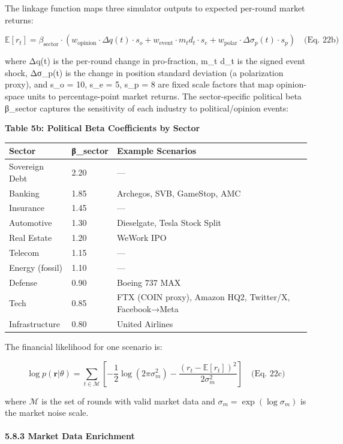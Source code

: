 \documentclass[
]{article}
\begin{document}
The linkage function maps three simulator outputs to expected per-round
market returns:

\[\mathbb{E}[r_t] = \beta_{\text{sector}} \cdot \left( w_{\text{opinion}} \cdot \Delta q(t) \cdot s_o + w_{\text{event}} \cdot m_t d_t \cdot s_e + w_{\text{polar}} \cdot \Delta \sigma_p(t) \cdot s_p \right) \quad \text{(Eq. 22b)}\]

where Δq(t) is the per-round change in pro-fraction, m\_t d\_t is the
signed event shock, Δσ\_p(t) is the change in position standard
deviation (a polarization proxy), and s\_o = 10, s\_e = 5, s\_p = 8 are
fixed scale factors that map opinion-space units to percentage-point
market returns. The sector-specific political beta β\_sector captures
the sensitivity of each industry to political/opinion events:

\textbf{Table 5b: Political Beta Coefficients by Sector}

\begin{longtable}[]{@{}lll@{}}
\toprule\noalign{}
Sector & β\_sector & Example Scenarios \\
\midrule\noalign{}
\endhead
\bottomrule\noalign{}
\endlastfoot
Sovereign Debt & 2.20 & --- \\
Banking & 1.85 & Archegos, SVB, GameStop, AMC \\
Insurance & 1.45 & --- \\
Automotive & 1.30 & Dieselgate, Tesla Stock Split \\
Real Estate & 1.20 & WeWork IPO \\
Telecom & 1.15 & --- \\
Energy (fossil) & 1.10 & --- \\
Defense & 0.90 & Boeing 737 MAX \\
Tech & 0.85 & FTX (COIN proxy), Amazon HQ2, Twitter/X, Facebook→Meta \\
Infrastructure & 0.80 & United Airlines \\
\end{longtable}

The financial likelihood for one scenario is:

\[\log p(\mathbf{r} | \theta) = \sum_{t \in \mathcal{M}} \left[ -\frac{1}{2}\log(2\pi\sigma_m^2) - \frac{(r_t - \mathbb{E}[r_t])^2}{2\sigma_m^2} \right] \quad \text{(Eq. 22c)}\]

where \(\mathcal{M}\) is the set of rounds with valid market data and
\(\sigma_m = \exp(\log\sigma_m)\) is the market noise scale.

\paragraph{5.8.3 Market Data Enrichment}\label{market-data-enrichment}
\end{document}
